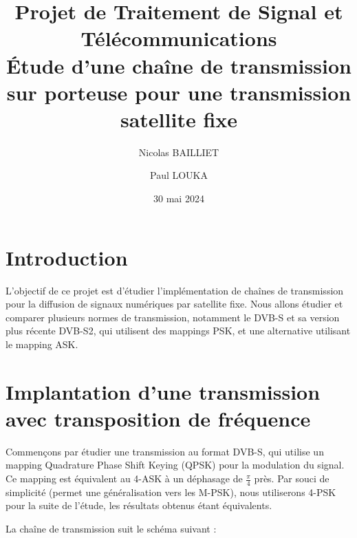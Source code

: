 \documentclass[a4paper, 12pt]{article}
\title{Projet de Traitement de Signal et Télécommunications \\
\Large Étude d’une chaîne de transmission sur porteuse pour une transmission
satellite ﬁxe}
\author{Nicolas BAILLIET \and Paul LOUKA}
\date{30 mai 2024}
\begin{document}
\maketitle
\tableofcontents


\clearpage
\section{Introduction}

L'objectif de ce projet est d'étudier l'implémentation de chaînes de
transmission pour la diffusion de signaux numériques par satellite fixe. Nous
allons étudier et comparer plusieurs normes de transmission, notamment le DVB-S
et sa version plus récente DVB-S2, qui utilisent des mappings PSK, et une
alternative utilisant le mapping ASK.

\section{Implantation d'une transmission avec transposition de fréquence}

Commençons par étudier une transmission au format DVB-S, qui utilise un mapping
Quadrature Phase Shift Keying (QPSK) pour la modulation du signal. Ce mapping
est équivalent au 4-ASK à un déphasage de $\frac{\pi}{4}$ près. Par souci de
simplicité (permet une généralisation vers les M-PSK), nous utiliserons 4-PSK
pour la suite de l'étude, les résultats obtenus étant équivalents. \medbreak

La chaîne de transmission suit le schéma suivant :
\end{document}
